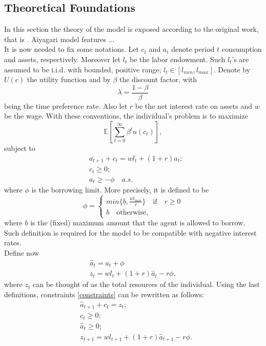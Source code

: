 \documentclass[12pt]{article}
\begin{document}
\subsection{Theoretical Foundations}
In this section the theory of the model is exposed according to the original work, that is \cite{aiya94}.
Aiyagari model features ... \\
It is now needed to fix some notations. Let $c_t$ and $a_t$ denote period $t$ consumption and assets, respectively. Moreover let $l_t$ be the labor endowment. Such $l_t$'s are assumed to be i.i.d. with bounded, positive range; $l_t \in \left[l_{min}, l_{max} \right]$. Denote by $U(c)$ the utility function and  by $\beta$ the discount factor, with
\begin{equation}
\lambda = \frac{1 - \beta}{\beta}
\end{equation}
being the time preference rate. Also let $r$ be the net interest rate on assets and $w$ be the wage. With these conventions, the individual's problem is to maximize
\begin{equation}
\label{problem}
\mathbb E \left[ \sum_{t=0}^{\infty} \beta^t u(c_t) \right],
\end{equation}
subject to 
\begin{align}
\label{constraints}
&a_{t+1} + c_t = wl_t + (1+r)a_t; \nonumber \\
&c_t \geq 0; \nonumber \\
&a_t \geq -\phi \quad a.s .
\end{align}
where $\phi$ is the borrowing limit. More precisely, it is defined to be
\begin{equation}
\phi = \begin{cases}
		min\{b, \frac{wl_{min}}{r} \} \quad \text{if} \quad r \geq 0 \\
		b \quad \text{otherwise,}
		\end{cases}
\end{equation}
where $b$ is the (fixed) maximum amount that the agent is allowed to borrow. Such definition is required for the model to be compatible with negative interest rates. \\
Define now
\begin{align}
\label{hata}
\hat{a}_t = a_t + \phi \\
z_t = wl_t + (1 + r)\hat{a}_t -r\phi,
\end{align}
where $z_t$ can be thought of as the total resources of the individual. Using the last definitions, constraints \ref{constraints} can be rewritten as follows:
\begin{align}
\label{newconstraint}
&\hat{a}_{t+1} + c_t = z_t;  \\
&c_t \geq 0; \nonumber \\
&\hat{a}_t \geq 0; \nonumber \\
&z_{t+1} = wl_{t+1} + (1 + r)\hat{a}_{t+1} - r\phi.
\end{align}
\end{document}
